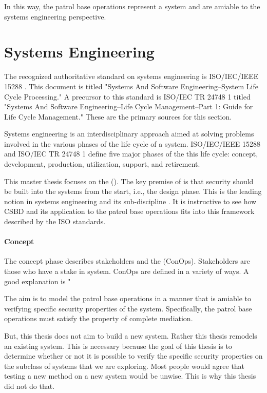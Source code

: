 \documentclass[../../main/main.tex]{subfiles}
\begin{document}
In this way, the patrol base operations represent a system and are amiable to the systems engineering perspective.  

\section{Systems Engineering}\label{sec:se}
The recognized authoritative standard on systems engineering is ISO/IEC/IEEE 15288 \cite{iso15288}.  This document is titled "Systems And Software Engineering--System Life Cycle Processing."  A precursor to this standard is ISO/IEC TR 24748 1 \cite{iso24748} titled "Systems And Software Engineering--Life Cycle Management--Part 1: Guide for Life Cycle Management."   These are the primary sources for this section.

Systems engineering is an interdisciplinary approach aimed at solving problems involved in the various phases of the life cycle of a system.  ISO/IEC/IEEE 15288 and ISO/IEC TR 24748 1 define five major phases of the this life cycle: concept, development, production, utilization, support, and retirement.
  
This master thesis focuses on the  ().  The key premise of  is that security should be built into the systems from the start, i.e., the design phase.  This is the leading notion in systems engineering and its sub-discipline .  It is instructive to see how CSBD and its application to the patrol base operations fits into this framework described by the ISO standards.

\paragraph*{Concept} The concept phase describes stakeholders and the  (ConOps).  Stakeholders are those who have a stake in system.  ConOps are defined in a variety of ways.  A good explanation is "

 The aim is to model the patrol base operations in a manner that is amiable to verifying specific security properties of the system.  Specifically, the patrol base operations must satisfy the property of complete mediation. 


But, this thesis does not aim to build a new system.  Rather this thesis remodels an existing system.   This is necessary because the goal of this thesis is to determine whether or not it is possible to verify the specific security properties on the subclass of systems that we are exploring.  Most people would agree that testing a new method on a new system would be unwise.  This is why this thesis did not do that.    
\end{document}
